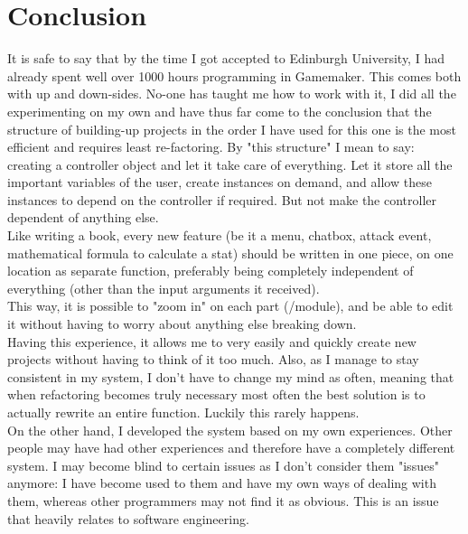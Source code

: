 \documentclass[12pt]{report}
\begin{document}
\section*{Conclusion}
It is safe to say that by the time I got accepted to Edinburgh University, I had already spent well over 1000 hours programming in Gamemaker. This comes both with up and down-sides. No-one has taught me how to work with it, I did all the experimenting on my own and have thus far come to the conclusion that the structure of building-up projects in the order I have used for this one is the most efficient and requires least re-factoring. By "this structure" I mean to say: creating a controller object and let it take care of everything. Let it store all the important variables of the user, create instances on demand, and allow these instances to depend on the controller if required. But not make the controller dependent of anything else.\\
Like writing a book, every new feature (be it a menu, chatbox, attack event, mathematical formula to calculate a stat) should be written in one piece, on one location as separate function, preferably being completely independent of everything (other than the input arguments it received).\\
This way, it is possible to "zoom in" on each part (/module), and be able to edit it without having to worry about anything else breaking down.\\
Having this experience, it allows me to very easily and quickly create new projects without having to think of it too much. Also, as I manage to stay consistent in my system, I don't have to change my mind as often, meaning that when refactoring becomes truly necessary most often the best solution is to actually rewrite an entire function. Luckily this rarely happens.\\
On the other hand, I developed the system based on my own experiences. Other people may have had other experiences and therefore have a completely different system. I may become blind to certain issues as I don't consider them "issues" anymore: I have become used to them and have my own ways of dealing with them, whereas other programmers may not find it as obvious. This is an issue that heavily relates to software engineering.
\end{document}
